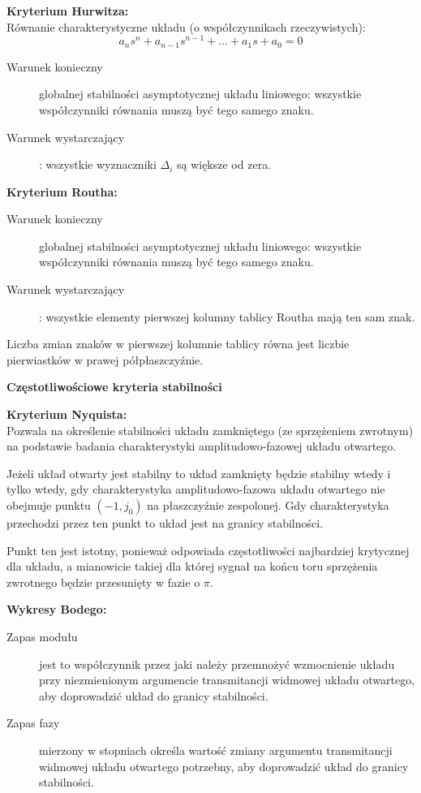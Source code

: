 \textbf{Kryterium Hurwitza:}\\
Równanie charakterystyczne układu (o współczynnikach rzeczywistych):\\
\begin{equation}
    a_ns^n+a_{n-1}s^{n-1}+...+a_1s + a_0 = 0
\end{equation}
\begin{description}
    \item[Warunek konieczny] globalnej stabilności asymptotycznej układu liniowego: wszystkie współczynniki równania muszą być tego samego znaku.
    \item[Warunek wystarczający]: wszystkie wyznaczniki $\Delta_i$ są większe od zera.
\end{description}

\textbf{Kryterium Routha:}\\
\begin{description}
    \item[Warunek konieczny] globalnej stabilności asymptotycznej układu liniowego: wszystkie współczynniki równania muszą być tego samego znaku.
    \item[Warunek wystarczający]: wszystkie elementy pierwszej kolumny tablicy Routha mają ten sam znak.
\end{description}
Liczba zmian znaków w pierwszej kolumnie tablicy równa jest liczbie pierwiastków w prawej półpłaszczyźnie.

\textbf{Częstotliwościowe kryteria stabilności}

\textbf{Kryterium Nyquista:}\\
Pozwala na określenie stabilności układu zamkniętego (ze sprzężeniem zwrotnym) na podstawie badania charakterystyki amplitudowo-fazowej układu otwartego.

Jeżeli układ otwarty jest stabilny to układ zamknięty będzie stabilny wtedy i tylko wtedy, gdy charakterystyka amplitudowo-fazowa układu otwartego nie obejmuje punktu $(-1,j_0)$ na płaszczyźnie zespolonej. Gdy charakterystyka przechodzi przez ten punkt to układ jest na granicy stabilności.

Punkt ten jest istotny, ponieważ odpowiada częstotliwości najbardziej krytycznej dla układu, a mianowicie takiej dla której sygnał na końcu toru sprzężenia zwrotnego będzie przesunięty w fazie o $\pi$.

\textbf{Wykresy Bodego:}\\
\begin{description}
    \item[Zapas modułu] jest to współczynnik przez jaki należy przemnożyć wzmocnienie układu przy niezmienionym argumencie transmitancji widmowej układu otwartego, aby doprowadzić układ do granicy stabilności.
    \item[Zapas fazy] mierzony w stopniach określa wartość zmiany argumentu transmitancji widmowej układu otwartego potrzebny, aby doprowadzić układ do granicy stabilności.
\end{description}

